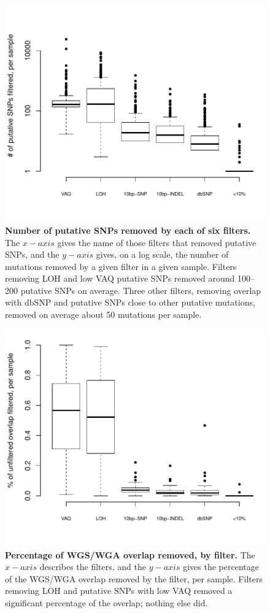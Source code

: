 \documentclass[11pt]{article} %
\begin{document}
\begin{figure}
\centerline{
\includegraphics[width=6in]{boxplot_number_filtered.pdf} }
\caption{\textbf{Number of putative SNPs removed by each of six filters.} The $x-axis$ gives the name of those filters that removed putative SNPs, and the $y-axis$ gives, on a log scale, the number of mutations removed by a given filter in a given sample. Filters removing LOH and low VAQ putative SNPs removed around 100--200 putative SNPs on average. Three other filters, removing overlap with dbSNP and putative SNPs close to other putative mutations, removed on average about 50 mutations per sample.}
\end{figure}

\begin{figure}
\centerline{
\includegraphics[width=6in]{boxplot_percent_overlap_filtered.pdf} }
\caption{\textbf{Percentage of WGS/WGA overlap removed, by filter.} The $x-axis$ describes the filters, and the $y-axis$ gives the percentage of the WGS/WGA overlap removed by the filter, per sample. Filters removing LOH and putative SNPs with low VAQ removed a significant percentage of the overlap; nothing else did.}
\end{figure}
\end{document}
